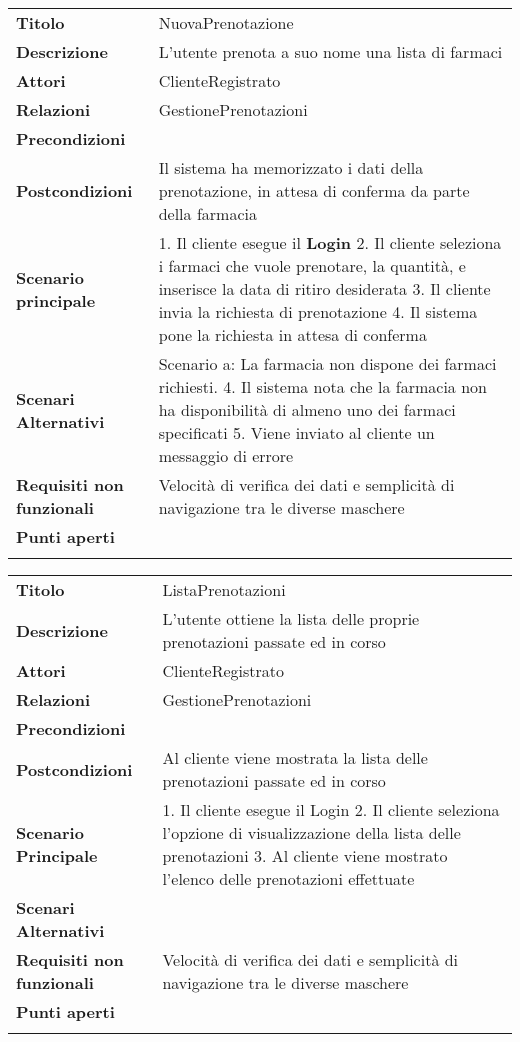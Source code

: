 \begin{longtable}[c]{@{}ll@{}}
\toprule\addlinespace
\textbf{Titolo} & NuovaPrenotazione
\\\addlinespace
\textbf{Descrizione} & L'utente prenota a suo nome una lista di farmaci
\\\addlinespace
\textbf{Attori} & ClienteRegistrato
\\\addlinespace
\textbf{Relazioni} & GestionePrenotazioni
\\\addlinespace
\textbf{Precondizioni} &
\\\addlinespace
\textbf{Postcondizioni} & Il sistema ha memorizzato i dati della
prenotazione, in attesa di conferma da parte della farmacia
\\\addlinespace
\textbf{Scenario principale} & 1. Il cliente esegue il \textbf{Login} 2.
Il cliente seleziona i farmaci che vuole prenotare, la quantità, e
inserisce la data di ritiro desiderata 3. Il cliente invia la richiesta
di prenotazione 4. Il sistema pone la richiesta in attesa di conferma
\\\addlinespace
\textbf{Scenari Alternativi} & Scenario a: La farmacia non dispone dei
farmaci richiesti. 4. Il sistema nota che la farmacia non ha
disponibilità di almeno uno dei farmaci specificati 5. Viene inviato al
cliente un messaggio di errore
\\\addlinespace
\textbf{Requisiti non funzionali} & Velocità di verifica dei dati e
semplicità di navigazione tra le diverse maschere
\\\addlinespace
\textbf{Punti aperti} &
\\\addlinespace
\bottomrule
\end{longtable}

\begin{longtable}[c]{@{}ll@{}}
\toprule\addlinespace
\textbf{Titolo} & ListaPrenotazioni
\\\addlinespace
\textbf{Descrizione} & L'utente ottiene la lista delle proprie
prenotazioni passate ed in corso
\\\addlinespace
\textbf{Attori} & ClienteRegistrato
\\\addlinespace
\textbf{Relazioni} & GestionePrenotazioni
\\\addlinespace
\textbf{Precondizioni} &
\\\addlinespace
\textbf{Postcondizioni} & Al cliente viene mostrata la lista delle
prenotazioni passate ed in corso
\\\addlinespace
\textbf{Scenario Principale} & 1. Il cliente esegue il Login 2. Il
cliente seleziona l'opzione di visualizzazione della lista delle
prenotazioni 3. Al cliente viene mostrato l'elenco delle prenotazioni
effettuate
\\\addlinespace
\textbf{Scenari Alternativi} &
\\\addlinespace
\textbf{Requisiti non funzionali} & Velocità di verifica dei dati e
semplicità di navigazione tra le diverse maschere
\\\addlinespace
\textbf{Punti aperti} &
\\\addlinespace
\bottomrule
\end{longtable}

